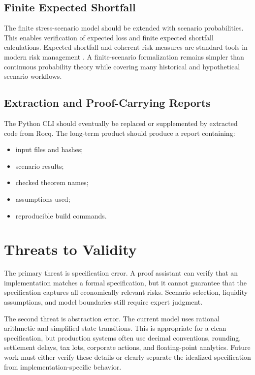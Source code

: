 \documentclass[11pt]{article}
\begin{document}
\subsection{Finite Expected Shortfall}

The finite stress-scenario model should be extended with scenario
probabilities. This enables verification of expected loss and finite expected
shortfall calculations. Expected shortfall and coherent risk measures are
standard tools in modern risk management
\cite{artzner1999coherent,rockafellar2000cvar}. A finite-scenario
formalization remains simpler than continuous probability theory while covering
many historical and hypothetical scenario workflows.

\subsection{Extraction and Proof-Carrying Reports}

The Python CLI should eventually be replaced or supplemented by extracted code
from Rocq. The long-term product should produce a report containing:

\begin{itemize}
  \item input files and hashes;
  \item scenario results;
  \item checked theorem names;
  \item assumptions used;
  \item reproducible build commands.
\end{itemize}

\section{Threats to Validity}

The primary threat is specification error. A proof assistant can verify that an
implementation matches a formal specification, but it cannot guarantee that the
specification captures all economically relevant risks. Scenario selection,
liquidity assumptions, and model boundaries still require expert judgment.

The second threat is abstraction error. The current model uses rational
arithmetic and simplified state transitions. This is appropriate for a clean
specification, but production systems often use decimal conventions,
rounding, settlement delays, tax lots, corporate actions, and floating-point
analytics. Future work must either verify these details or clearly separate
the idealized specification from implementation-specific behavior.
\end{document}
